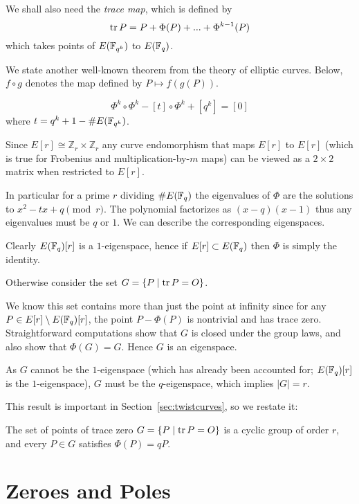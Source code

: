 We shall also need the \emph{trace map}, which is defined by
\[ \mathop{\rm tr} P = P + \Phi(P) + ... + \Phi^{k-1}(P) \]
which takes points of $E(\mathbb{F}_{q^k})$ to $E(\mathbb{F}_q)$.

We state another well-known theorem from the theory of elliptic curves.
Below, $f \circ g$ denotes the map defined by $P\mapsto f(g(P))$.

\begin{theorem}
[Hasse]
\[ \Phi^k \circ \Phi^k - [t] \circ \Phi^k + [q^k] = [0] \]
where $t = q^k + 1 - \#E(\mathbb{F}_{q^k})$.
\end{theorem}

Since $E[r] \cong \mathbb{Z}_r \times \mathbb{Z}_r$ any curve endomorphism
that maps $E[r]$ to $E[r]$ (which is true for Frobenius and
multiplication-by-$m$ maps)
can be viewed as a $2\times 2$ matrix when restricted to $E[r]$.

In particular for a prime $r$ dividing $\#E(\mathbb{F}_q)$ the eigenvalues
of $\Phi$ are the solutions to $x^2 - t x + q \pmod{r}$.
The polynomial factorizes as $(x - q)(x - 1)$ thus any eigenvalues
must be $q$ or $1$. We can describe the corresponding eigenspaces.

Clearly $E(\mathbb{F}_q)[r]$ is a $1$-eigenspace, hence if $E[r] \subset E(\mathbb{F}_q)$
then $\Phi$ is simply the identity.

Otherwise consider the set $G = \{P \mid \mathop{\rm tr} P = O \}$.

We know this set contains more than just the point at infinity
since for any $P \in E[r] \setminus E(\mathbb{F}_q)[r]$,
the point $P - \Phi(P)$ is nontrivial and has trace zero.
Straightforward computations show that $G$ is closed under the group laws,
and also show that $\Phi(G) = G$. Hence $G$ is an eigenspace.

As $G$ cannot be the $1$-eigenspace (which has already been accounted for;
$E(\mathbb{F}_q)[r]$ is the $1$-eigenspace), $G$ must be the $q$-eigenspace,
which implies $|G| = r$.

This result is important in Section~\ref{sec:twistcurves},
so we restate it:

\begin{theorem}
The set of points of trace zero
$G = \{P \mid \mathop{\rm tr} P = O \}$ is a cyclic group of order $r$,
and every $P \in G$ satisfies $\Phi(P) = q P$.
\end{theorem}

\section {Zeroes and Poles}

